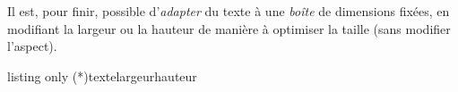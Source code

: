 \documentclass[french,11pt,a4paper]{article}
\begin{document}
Il est, pour finir, possible d'\textit{adapter} du texte à une \textit{boîte} de dimensions fixées, en modifiant la largeur ou la hauteur de manière à optimiser la taille (sans modifier l'aspect).

\begin{DemoCode}{listing only}
\fittexttobox(*){texte}{largeur}{hauteur}
\end{DemoCode}

\begin{DemoCode}{}
\\
\\
\\
\\
\\
\\
\end{DemoCode}

\begin{DemoCode}{}
\\
\\
\\
\\
\\
\\
\end{DemoCode}
\end{document}
